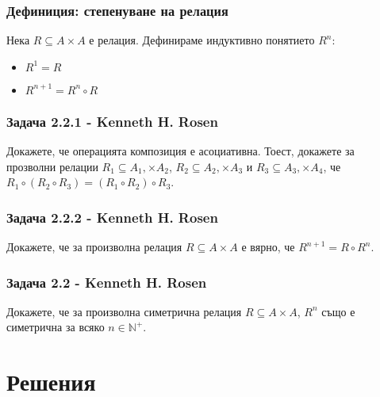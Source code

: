 \documentclass[12pt]{article}
\begin{document}
\subsubsection*{Дефиниция: степенуване на релация}
Нека $R \subseteq A \times A$ е релация. Дефинираме индуктивно понятието $R^n$:
\begin{itemize}
    \item $R^1 = R$
    \item $R^{n+1} = R^n \circ R$
\end{itemize}

\subsubsection*{Задача 2.2.1 - Kenneth H. Rosen}
Докажете, че операцията композиция е асоциативна. Тоест, докажете за прозволни релации $R_1 \subseteq A_1, \times A_2$, $R_2 \subseteq A_2, \times A_3$ и $R_3 \subseteq A_3, \times A_4$, че $R_1 \circ (R_2 \circ R_3) = (R_1 \circ R_2) \circ R_3$.

\subsubsection*{Задача 2.2.2 - Kenneth H. Rosen}
Докажете, че за произволна релация $R \subseteq A \times A$ е вярно, че $R^{n+1} = R \circ R^{n}$.

\subsubsection*{Задача 2.2 - Kenneth H. Rosen}
Докажете, че за произволна симетрична релация $R \subseteq A \times A$, $R^n$ също е симетрична за всяко $n \in \mathbb{N}^+$.

\section*{Решения}
\end{document}

